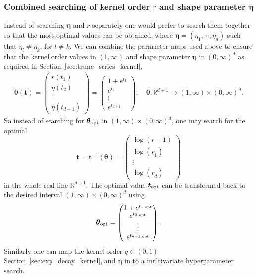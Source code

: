 \documentclass{svjour3}                     %
\newcommand{\bm}[1]{\boldsymbol{#1}}
\newcommand{\reals}{\mathbb{R}}
\newcommand{\veta}{{\bm{\eta}}}
\newcommand{\vtheta}{{\bm{\theta}}}
\newcommand{\vt}{\bm{t}}
\newcommand\secref{Section~\ref}
\begin{document}
\subsubsection{Combined searching of kernel order $r$ and shape parameter $\veta$}
Instead of searching $\veta$ and $r$ separately one would prefer to search them together so that the most optimal values can be obtained, where $\veta = (\eta_1, \cdots, \eta_d)$ such that $\eta_l \ne \eta_k$,  for $l \ne k$.
We can combine the parameter maps used above to ensure that the kernel order values in $(1, \infty)$ and shape parameter $\veta$ in $(0,\infty)^d$ as required in \secref{sec:trunc_series_kernel},
\begin{align*}
\vtheta(\vt) = 
\begin{pmatrix}
r(t_{1}) \\ \eta(t_2) \\ \vdots \\ \eta(t_{d+1}) 
\end{pmatrix} =
\begin{pmatrix}
1 + e^{t_1} \\ e^{t_2} \\ \vdots \\ e^{t_{d+1}}
\end{pmatrix}, 
\quad
\vtheta: \reals^{d+1} \to (1,\infty) \times (0,\infty)^d .
\end{align*}
So instead of searching for $\vtheta_{\textup{opt}}$ in $(1,\infty) \times (0,\infty)^d$, one may search for the optimal 
$$
\vt = \vt^{-1} (\vtheta) = 
\begin{pmatrix}
\log(r-1) \\ \log(\eta_1) \\ \vdots \\ \log(\eta_d)
\end{pmatrix}
$$ in the whole real line $\reals^{d+1}$.
The optimal value $\vt_{\textup{opt}}$ can be transformed back to the desired interval $(1,\infty) \times (0,\infty)^d$ using 
\begin{align*}
\vtheta_{\textup{opt}} = 
\begin{pmatrix}
1 + e^{t_{1, \textup{opt}}} \\
e^{t_{2, \textup{opt}}} \\
\vdots \\
e^{t_{d+1, \textup{opt}}} \\
\end{pmatrix}.
\end{align*}
Similarly one can map the kernel order $q \in (0,1)$ \secref{sec:exp_decay_kernel}, and $\veta$ in to a multivariate hyperparameter search.
\end{document}

